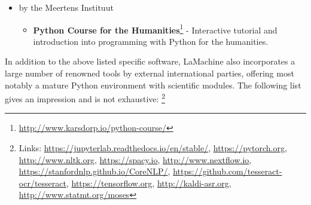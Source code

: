 \documentclass[a4paper,11pt]{article}
\begin{document}
\begin{itemize}
\begin{itemize}
     \item  \textbf{T-scan}\footnote{\url{https://github.com/proycon/tscan}} - T-scan is a Dutch text analytics tool for readability prediction (initially developed at TiCC, Tilburg University, and in collaboration with Radboud University, Nijmegen)
 \end{itemize}
 \item by the Meertens Instituut
 \begin{itemize}
     \item \textbf{Python Course for the Humanities}\footnote{\url{http://www.karsdorp.io/python-course/}} - Interactive
         tutorial and introduction into programming with Python for the humanities.
 \end{itemize}
\end{itemize}

In addition to the above listed specific software, LaMachine also incorporates a large number of renowned tools by external international parties, offering
most notably a mature Python environment with scientific modules. The following list gives an impression and is not
exhaustive: \footnote{Links: \url{https://jupyterlab.readthedocs.io/en/stable/}, \url{https://pytorch.org}, \url{http://www.nltk.org},
    \url{https://spacy.io},  \url{http://www.nextflow.io}, \url{https://stanfordnlp.github.io/CoreNLP/},  \url{https://github.com/tesseract-ocr/tesseract}, \url{https://tensorflow.org},
\url{http://kaldi-asr.org}, \url{http://www.statmt.org/moses}}
\end{document}
